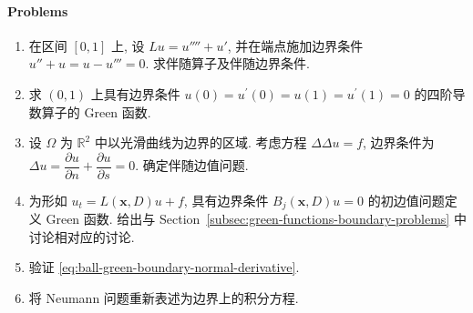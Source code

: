 \paragraph*{Problems}

\begin{enumerate}[label=\thesection.\arabic*.,ref=\thesection.\arabic*,start=56,series=book-problems]

\item\label{ex:fourth-order-drift-adjoint-boundary} 在区间 $[0,1]$ 上, 设 $Lu=u''''+u'$, 并在端点施加边界条件 $u''+u=u-u'''=0$. 求伴随算子及伴随边界条件.

\item\label{ex:clamped-fourth-derivative-green-function} 求 $(0,1)$ 上具有边界条件 $u(0)=u^{\prime}(0)=u(1)=u^{\prime}(1)=0$ 的四阶导数算子的 Green 函数.

\item\label{ex:biharmonic-normal-tangential-adjoint} 设 $\Omega$ 为 $\mathbb{R}^2$ 中以光滑曲线为边界的区域. 考虑方程 $\Delta\Delta u=f$, 边界条件为 $\Delta u=\dfrac{\partial u}{\partial n}+\dfrac{\partial u}{\partial s}=0$. 确定伴随边值问题.

\item\label{ex:evolution-initial-boundary-green-function} 为形如 $u_t=L(\bm{x},D)u+f$, 具有边界条件 $B_j(\bm{x},D)u=0$ 的初边值问题定义 Green 函数. 给出与 Section~\ref{subsec:green-functions-boundary-problems} 中讨论相对应的讨论.

\item\label{ex:verify-ball-green-normal-derivative} 验证 \eqref{eq:ball-green-boundary-normal-derivative}.

\item\label{ex:neumann-boundary-integral-equation} 将 Neumann 问题重新表述为边界上的积分方程.

\end{enumerate}
